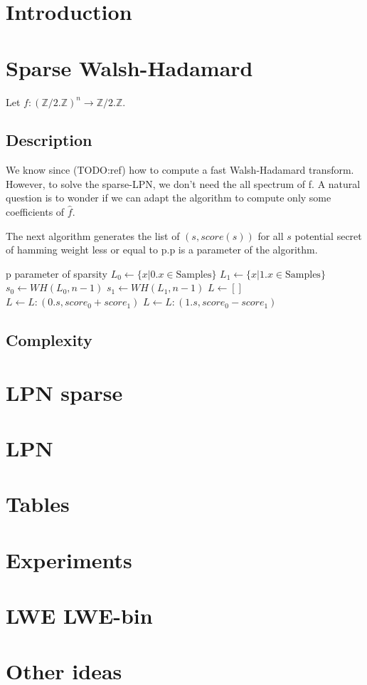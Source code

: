 \documentclass{article}		%
\begin{document}
\title{}
\author{}
\date\today

\maketitle
\section{Introduction}
\section{Sparse Walsh-Hadamard}
Let $f:(\mathbb{Z}/2.\mathbb{Z})^n \rightarrow \mathbb{Z}/2.\mathbb{Z}$.

\subsection{Description}
We know since (TODO:ref) how to compute a fast Walsh-Hadamard transform.
However, to solve the sparse-LPN, we don't need the all spectrum of f. 
A natural question is to wonder if we can adapt the algorithm to compute only
some coefficients of $\hat{f}$. 


The next algorithm generates the list of $(s,score(s))$ for all $s$ potential secret of
hamming weight less or equal to p.p is a parameter of the algorithm.
\begin{framed}
\begin{algorithmic}
\State p parameter of sparsity
   \EndIf
\State $L_0 \gets \{x | 0.x \in \text{Samples} \}$
\State $L_1 \gets \{x | 1.x \in \text{Samples} \}$
\State $s_0 \gets WH(L_0,n-1)$ 
\State $s_1 \gets WH(L_1,n-1)$
\State$ L \gets []$
  \State $ L\gets L:(0.s, score_0 + score_1)    $
   $L\gets L: (1.s ,  score_0 - score_1)  $ \EndIf 
\EndFor
{}
\EndFunction
\end{algorithmic}
\end{framed}

\subsection{Complexity}
\section{LPN sparse}
\section{LPN}
\section{Tables}
\section{Experiments}
\section{LWE LWE-bin}
\section{Other ideas}
\end{document}
